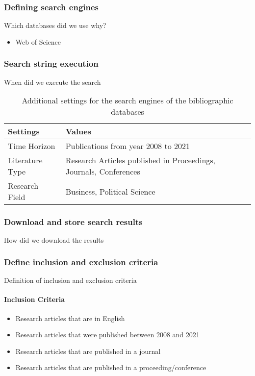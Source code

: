 \subsubsection{Defining search engines}
\label{subsubsec: Defining search engines}

Which databases did we use why?

\begin{itemize}
    \item Web of Science
\end{itemize}


\subsubsection{Search string execution}

When did we execute the search

\begin{table}
	\caption{Additional settings for the search engines of the bibliographic databases}
	\centering
	\begin{tabular}{ll}
		\toprule
		Settings     & Values \\
		\midrule
		Time Horizon & Publications from year 2008 to 2021 \\ 
		Literature Type & Research Articles published in Proceedings, Journals, Conferences \\
		Research Field & Business, Political Science\\
		\bottomrule 
	\end{tabular}
	\label{tab: search settings}
\end{table} 

\subsubsection{Download and store search results}

How did we download the results

\subsubsection{Define inclusion and exclusion criteria}

Definition of inclusion and exclusion criteria

\paragraph{Inclusion Criteria}
\begin{itemize}
    \item Research articles that are in English
    \item Research articles that were published between 2008 and 2021
    \item Research articles that are published in a journal
    \item Research articles that are published in a proceeding/conference
\end{itemize}

